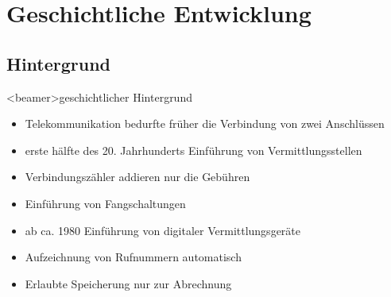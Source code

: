 
\section{Geschichtliche Entwicklung}
  \subsection{Hintergrund}
    \begin{frame}<beamer>{geschichtlicher Hintergrund}
      \begin{itemize}
        \item
          Telekommunikation bedurfte früher die Verbindung von zwei Anschlüssen
        \item
          erste hälfte des 20. Jahrhunderts Einführung von Vermittlungsstellen
        \item
          Verbindungszähler addieren nur die Gebühren
        \item
          Einführung von Fangschaltungen
        \item 
         ab ca. 1980 Einführung von digitaler Vermittlungsgeräte
        \item
          Aufzeichnung von Rufnummern automatisch
        \item
          Erlaubte Speicherung nur zur Abrechnung


      \end{itemize}
    \end{frame}

